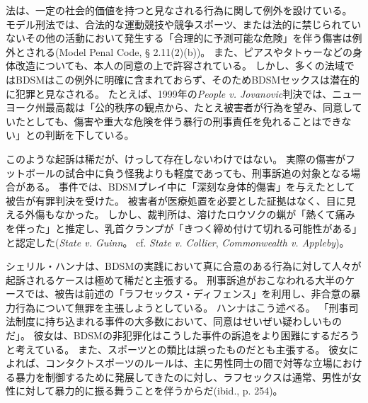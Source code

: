 \documentclass[paper=a4,book,openany]{jlreq}
\begin{document}
法は、一定の社会的価値を持つと見なされる行為に関して例外を設けている。
モデル刑法では、合法的な運動競技や競争スポーツ、または法的に禁じられていないその他の活動において発生する「合理的に予測可能な危険」を伴う傷害は例外とされる(Model Penal Code, § 2.11(2)(b))。
また、ピアスやタトゥーなどの身体改造についても、本人の同意の上で許容されている。
しかし、多くの法域ではBDSMはこの例外に明確に含まれておらず、そのためBDSMセックスは潜在的に犯罪と見なされる。
たとえば、1999年の\emph{People v. Jovanovic}判決では、ニューヨーク州最高裁は「公的秩序の観点から、たとえ被害者が行為を望み、同意していたとしても、傷害や重大な危険を伴う暴行の刑事責任を免れることはできない」との判断を下している。

このような起訴は稀だが、けっして存在しないわけではない。
実際の傷害がフットボールの試合中に負う怪我よりも軽度であっても、刑事訴追の対象となる場合がある。
事件では、BDSMプレイ中に「深刻な身体的傷害」を与えたとして被告が有罪判決を受けた。
被害者が医療処置を必要とした証拠はなく、目に見える外傷もなかった。
しかし、裁判所は、溶けたロウソクの蝋が「熱くて痛みを伴った」と推定し、乳首クランプが「きつく締め付けて切れる可能性がある」と認定した(\emph{State v. Guinn}。
cf.  \emph{State v. Collier}, \emph{Commonwealth v. Appleby})。

シェリル・ハンナは、BDSMの実践において真に合意のある行為に対して人々が起訴されるケースは極めて稀だと主張する。
刑事訴追がおこなわれる大半のケースでは、被告は前述の「ラフセックス・ディフェンス」を利用し、非合意の暴力行為について無罪を主張しようとしている。
ハンナはこう述べる。
「刑事司法制度に持ち込まれる事件の大多数において、同意はせいぜい疑わしいものだ」\citep[p.248]{hanna01:_sex_is_not_sport}。
彼女は、BDSMの非犯罪化はこうした事件の訴追をより困難にするだろうと考えている。
また、スポーツとの類比は誤ったものだとも主張する。
彼女によれば、コンタクトスポーツのルールは、主に男性同士の間で対等な立場における暴力を制御するために発展してきたのに対し、ラフセックスは通常、男性が女性に対して暴力的に振る舞うことを伴うからだ(ibid., p. 254)。
\end{document}
